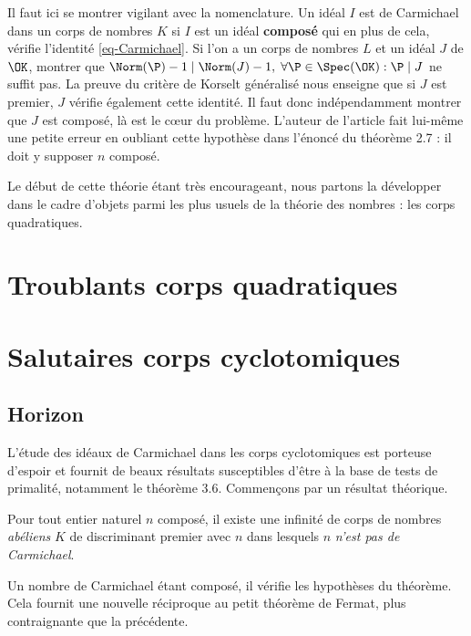 \documentclass[a4paper, 12pt, oneside]{article}
\begin{document}
\begin{remarque}
	Il faut ici se montrer vigilant avec la nomenclature. Un idéal $I$ est de Carmichael dans un corps de nombres $K$ si $I$ est un idéal \textbf{composé} qui en plus de cela, vérifie l'identité \ref{eq-Carmichael}. Si l'on a un corps de nombres $L$ et un idéal $J$ de $\OK$, montrer que $\Norm(\P) - 1\mid \Norm(J) - 1,\; \forall \P\in \Spec(\OK) : \P\mid J$ ne suffit pas. La preuve du critère de Korselt généralisé nous enseigne que si $J$ est premier, $J$ vérifie également cette identité. Il faut donc indépendamment montrer que $J$ est composé, là est le cœur du problème. L'auteur de l'article fait lui-même une petite erreur en oubliant cette hypothèse dans l'énoncé du théorème 2.7 : il doit y supposer $n$ composé.
\end{remarque}

Le début de cette théorie étant très encourageant, nous partons la développer dans le cadre d'objets parmi les plus usuels de la théorie des nombres : les corps quadratiques.

\section{Troublants corps quadratiques}

\section{Salutaires corps cyclotomiques}

\subsection{Horizon}

L'étude des idéaux de Carmichael dans les corps cyclotomiques est porteuse d'espoir et fournit de beaux résultats susceptibles d'être à la base de tests de primalité, notamment le théorème 3.6. Commençons par un résultat théorique.

\begin{theoreme}
	Pour tout entier naturel $n$ composé, il existe une infinité de corps de nombres \emph{abéliens} $K$ de discriminant premier avec $n$ dans lesquels $n$ \emph{n'est pas de Carmichael}.
\end{theoreme}

Un nombre de Carmichael étant composé, il vérifie les hypothèses du théorème. Cela fournit une nouvelle réciproque au petit théorème de Fermat, plus contraignante que la précédente.
\end{document}
